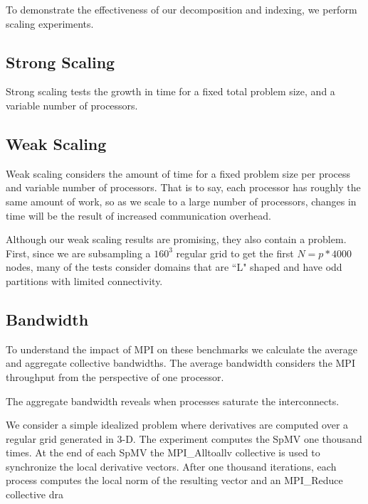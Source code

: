 \documentclass{report}
\begin{document}
To demonstrate the effectiveness of our decomposition and indexing, we perform scaling experiments. 

\subsection{Strong Scaling}
Strong scaling tests the growth in time for a fixed total problem size, and a variable number of processors. 

\subsection{Weak Scaling}
Weak scaling considers the amount of time for a fixed problem size per process and variable number of processors. That is to say, each processor has roughly the same amount of work, so as we scale to a large number of processors, changes in time will be the result of increased communication overhead. 

Although our weak scaling results are promising, they also contain a problem. First, since we are subsampling a $160^3$ regular grid to get the first $N=p*4000$ nodes, many of the tests consider domains that are ``L" shaped and have odd partitions with limited connectivity.



\subsection{Bandwidth}

To understand the impact of MPI on these benchmarks we calculate the average and aggregate collective bandwidths. The average bandwidth considers the MPI throughput from the perspective of one processor. 

The aggregate bandwidth reveals when processes saturate the interconnects. 

We consider a simple idealized problem where derivatives are computed over a regular grid generated in 3-D. The experiment computes the SpMV one thousand times. At the end of each SpMV the MPI\_Alltoallv collective is used to synchronize the local derivative vectors. After one thousand iterations, each process computes the local norm of the resulting vector and an MPI\_Reduce collective dra
\end{document}
